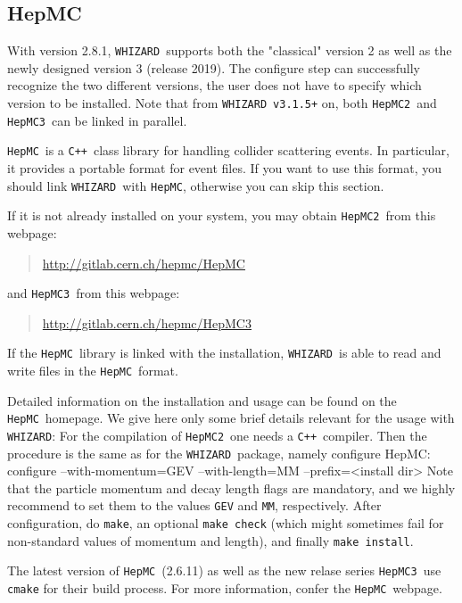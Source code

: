 \documentclass[12pt]{book}
\newenvironment{interaction}%
  {\begingroup\small
   \Verbatim}%
  {\endVerbatim
   \endgroup\noindent}
\newcommand{\ttt}[1]{\texttt{#1}}
\newcommand{\whizard}{\ttt{WHIZARD}}
\newcommand{\hepmc}{\ttt{HepMC}}
\newcommand{\hepmctwo}{\ttt{HepMC2}}
\newcommand{\hepmcthree}{\ttt{HepMC3}}
\newcommand{\cpp}{\ttt{C++}}
\begin{document}

\subsection{HepMC}
\label{sec:hepmc}

With version 2.8.1, \whizard\ supports both the "classical" version 2
as well as the newly designed version 3 (release 2019). The configure
step can successfully recognize the two  different versions, the user
does not have to specify which version to be installed.
Note that from \whizard\ \texttt{v3.1.5+} on, both \hepmctwo\ and
\hepmcthree\ can be linked in parallel.

\hepmc\ is a \cpp\ class library for handling collider scattering
events.  In particular, it provides a portable format for event files.
If you want to use this format, you should link \whizard\ with \hepmc,
otherwise you can skip this section.

If it is not already installed on your system, you may obtain
\hepmctwo\ from this webpage:
\begin{quote}
  \url{http://gitlab.cern.ch/hepmc/HepMC}
\end{quote}
and \hepmcthree\ from this webpage:
\begin{quote}
  \url{http://gitlab.cern.ch/hepmc/HepMC3}
\end{quote}
If the \hepmc\ library is linked with the installation, \whizard\ is
able to read and write files in the \hepmc\ format.

Detailed information on the installation and usage can be found on the
\hepmc\ homepage. We give here only some brief details relevant for
the usage with \whizard: For the compilation of \hepmctwo\ one needs a
\cpp\ compiler. Then the procedure is the same as for the
\whizard\ package, namely configure HepMC:
\begin{interaction}
  configure --with-momentum=GEV --with-length=MM --prefix=<install dir>
\end{interaction}
Note that the particle momentum and decay length flags are mandatory, and
we highly recommend to set them to the values \ttt{GEV} and \ttt{MM},
respectively. After configuration, do \ttt{make}, an optional
\ttt{make check} (which might sometimes fail for non-standard values
of momentum and length), and finally \ttt{make install}.

The latest version of \hepmc\ (2.6.11) as well as the new relase
series \hepmcthree\ use \texttt{cmake} for their build process. For
more information, confer the \hepmc\ webpage.
\end{document}
